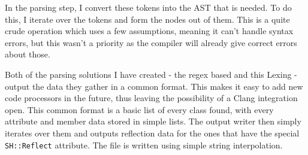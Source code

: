 In the parsing step, I convert these tokens into the AST that is needed. To do this, I iterate over the tokens and form the nodes out of them. This is a quite crude operation which uses a few assumptions, meaning it can't handle syntax errors, but this wasn't a priority as the compiler will already give correct errors about those.

Both of the parsing solutions I have created - the regex based and this Lexing - output the data they gather in a common format.
This makes it easy to add new code processors in the future, thus leaving the possibility of a Clang integration open.
This common format is a basic list of every class found, with every attribute and member data stored in simple lists. The output writer then simply iterates over them and outputs reflection data for the ones that have the special \verb|SH::Reflect| attribute. The file is written using simple string interpolation.
